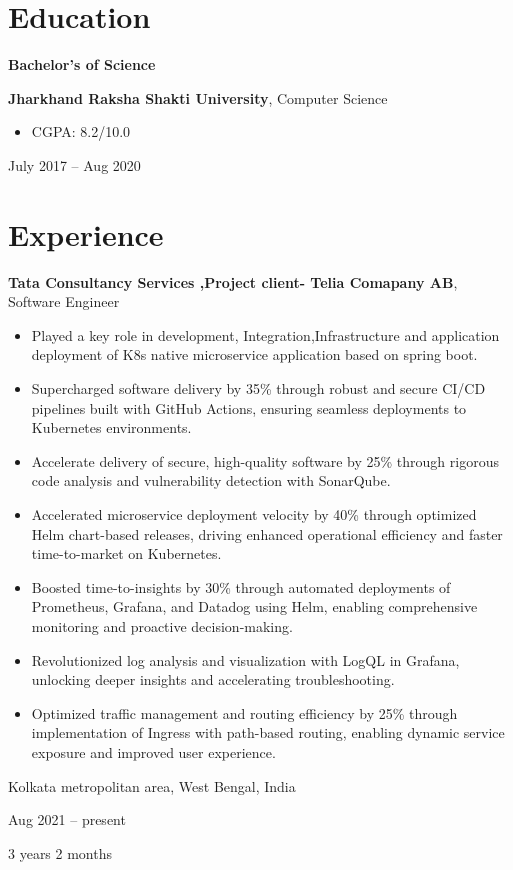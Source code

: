 \documentclass[10pt, letterpaper]{article}
\newenvironment{highlights}{
    \begin{itemize}[
        topsep=0.10 cm,
        parsep=0.10 cm,
        partopsep=0pt,
        itemsep=0pt,
        leftmargin=0.4 cm + 10pt
    ]
}{
    \end{itemize}
} %
\newenvironment{twocolentry}[2][]{
    \onecolentry
    \def\secondColumn{#2}
    \setcolumnwidth{\fill, 4.5 cm}
    \begin{paracol}{2}
}{
    \switchcolumn \raggedleft \secondColumn
    \end{paracol}
    \endonecolentry
} %
\newenvironment{threecolentry}[3][]{
    \onecolentry
    \def\thirdColumn{#3}
    \setcolumnwidth{1 cm, \fill, 4.5 cm}
    \begin{paracol}{3}
    {\raggedright #2} \switchcolumn
}{
    \switchcolumn \raggedleft \thirdColumn
    \end{paracol}
    \endonecolentry
} %
\begin{document}
    
    \section{Education}



        
        \begin{threecolentry}{\textbf{Bachelor's of Science}}{
            July 2017 – Aug 2020
        }
            \textbf{Jharkhand Raksha Shakti University}, Computer Science
            \begin{highlights}
                \item CGPA: 8.2/10.0
            \end{highlights}
        \end{threecolentry}


    
    \section{Experience}



        
        \begin{twocolentry}{
            Kolkata metropolitan area, West Bengal, India

        Aug 2021 – present

        3 years 2 months
        }
            \textbf{Tata Consultancy Services ,Project client- Telia Comapany AB}, Software Engineer
            \begin{highlights}
                \item Played a key role in development, Integration,Infrastructure and application deployment of K8s native microservice application based on spring boot.
                \item Supercharged software delivery by 35\% through robust and secure CI/CD pipelines built with GitHub Actions, ensuring seamless deployments to Kubernetes environments.
                \item Accelerate delivery of secure, high-quality software by 25\% through rigorous code analysis and vulnerability detection with SonarQube.
                \item Accelerated microservice deployment velocity by 40\% through optimized Helm chart-based releases, driving enhanced operational efficiency and faster time-to-market on Kubernetes.
                \item Boosted time-to-insights by 30\% through automated deployments of Prometheus, Grafana, and Datadog using Helm, enabling comprehensive monitoring and proactive decision-making.
                \item Revolutionized log analysis and visualization with LogQL in Grafana, unlocking deeper insights and accelerating troubleshooting.
                \item Optimized traffic management and routing efficiency by 25\% through implementation of Ingress with path-based routing, enabling dynamic service exposure and improved user experience.
            \end{highlights}
        \end{twocolentry}
\end{document}
